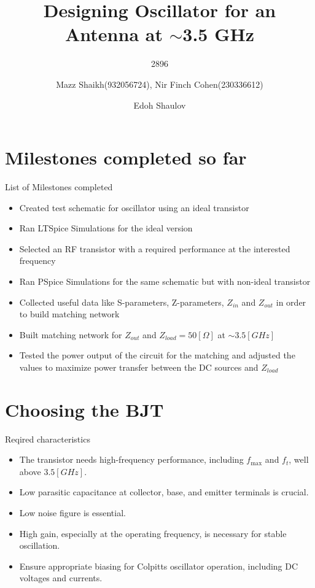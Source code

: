 \documentclass{beamer}
\title{Designing Oscillator for an Antenna at \(\sim\)3.5 GHz}
\date{}
\subtitle{2896}
\author{Mazz Shaikh(932056724), Nir Finch Cohen(230336612)}
\date{Edoh Shaulov}
\institute{Tel Aviv University}
\begin{document}
\maketitle


\section{Milestones completed so far}

\begin{frame}{List of Milestones completed}

\begin{itemize}
  \item<1-> Created test schematic for oscillator using an ideal transistor
  \item<2-> Ran LTSpice Simulations for the ideal version
  \item<3-> Selected an RF transistor with a required performance at the interested frequency
  \item<4-> Ran PSpice Simulations for the same schematic but with non-ideal transistor
  \item<5-> Collected useful data like S-parameters, Z-parameters, \(Z_{in}\) and \(Z_{out}\) in order to build matching network
  \item<6-> Built matching network for \(Z_{out}\) and \(Z_{load}=50[\Omega]\) at \(\sim3.5[GHz]\)
  \item<7-> Tested the power output of the circuit for the matching and adjusted the values to maximize power transfer between the DC sources and \(Z_{load}\)
\end{itemize}

\end{frame}





\section{Choosing the BJT}
\begin{frame}{Reqired characteristics}
  \begin{itemize}
    \item <1-> The transistor needs high-frequency performance, including \(f_{\text{max}}\) and \(f_t\), well above \(3.5[GHz]\).
    \item <2-> Low parasitic capacitance at collector, base, and emitter terminals is crucial.
    \item <3-> Low noise figure is essential.
    \item <4-> High gain, especially at the operating frequency, is necessary for stable oscillation.
    \item <5-> Ensure appropriate biasing for Colpitts oscillator operation, including DC voltages and currents.
  \end{itemize}
\end{frame}
\end{document}
